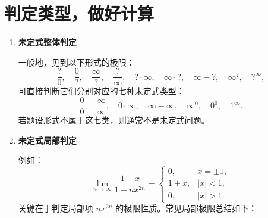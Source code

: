 
\section{判定类型，做好计算}

\begin{enumerate}
    \item \textbf{未定式整体判定} \DTwoThree

          一般地，见到以下形式的极限：
          \[
              \frac{?}{0}, \quad \frac{0}{?}, \quad \frac{\infty}{?}, \quad
              \frac{?}{\infty}, \quad ?\cdot\infty, \quad
              \infty\cdot?, \quad \infty-?, \quad \infty^{?}, \quad ?^{\infty},
          \]
          可直接判断它们分别对应的七种未定式类型：
          \[
              \frac{0}{0}, \quad \frac{\infty}{\infty}, \quad 0\cdot\infty, \quad
              \infty-\infty, \quad \infty^{0}, \quad 0^{0}, \quad 1^{\infty}.
          \]
          若题设形式不属于这七类，则通常不是未定式问题。

    \item \textbf{未定式局部判定} \DTwoThree

          例如：
          \[
              \lim_{n\to\infty}\frac{1+x}{1+nx^{2n}}=
              \begin{cases}
                  0,   & x=\pm1, \\
                  1+x, & |x|<1,  \\
                  0,   & |x|>1.
              \end{cases}
          \]
          关键在于判定局部项 $nx^{2n}$ 的极限性质。常见局部极限总结如下：


\end{enumerate}
